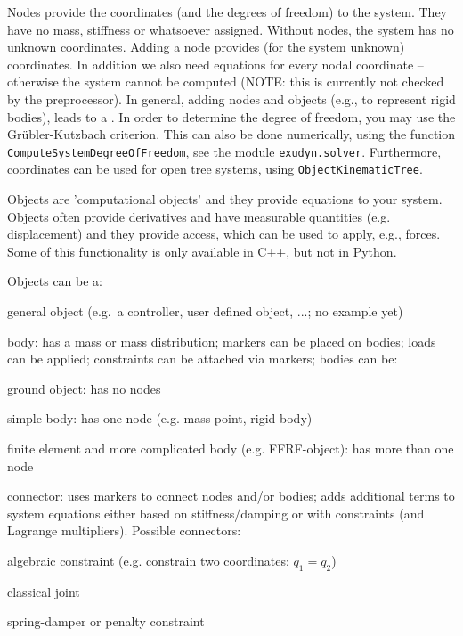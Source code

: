 
Nodes provide the coordinates (and the degrees of freedom) to the system. They have no mass, stiffness or whatsoever assigned.
Without nodes, the system has no unknown coordinates.
Adding a node provides (for the system unknown) coordinates. In addition we also need equations for every nodal coordinate -- otherwise the system cannot be computed (NOTE: this is currently not checked by the preprocessor).
In general, adding nodes and objects (e.g., to represent rigid bodies), leads to a . 
In order to determine the degree of freedom, you may use the Gr{\"u}bler-Kutzbach criterion. This can also be done numerically, using the function \texttt{ComputeSystemDegreeOfFreedom}, see the module \texttt{exudyn.solver}.
Furthermore,  coordinates can be used for open tree systems, using \texttt{ObjectKinematicTree}.

Objects are 'computational objects' and they provide equations to your system. Objects often provide derivatives and have measurable quantities (e.g. displacement) and they provide access, which can be used to apply, e.g., forces. Some of this functionality is only available in C++, but not in Python.

Objects can be a:
\bi
  \item general object (e.g.\ a controller, user defined object, ...; no example yet)
  \item body: has a mass or mass distribution; markers can be placed on bodies; loads can be applied; constraints can be attached via markers; bodies can be:
  \bi
    \item[--] ground object: has no nodes
    \item[--] simple body: has one node (e.g. mass point, rigid body)
    \item[--] finite element and more complicated body (e.g. FFRF-object): has more than one node
  \ei
  \item connector: uses markers to connect nodes and/or bodies; adds additional terms to system equations either based on stiffness/damping or with constraints (and Lagrange multipliers). Possible connectors:
  \bi
    \item[--] algebraic constraint (e.g. constrain two coordinates: $q_1 = q_2$)
    \item[--] classical joint
    \item[--] spring-damper or penalty constraint
  \ei
\ei


